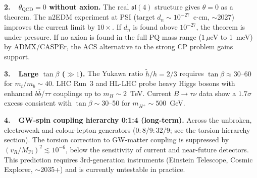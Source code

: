 \documentclass[11pt,a4paper]{article}
\theoremstyle{plain}
\theoremstyle{definition}
\theoremstyle{remark}
\begin{document}
\textbf{2.\ \ $\theta_{\mathrm{QCD}} = 0$ without axion.}
The real $\mathfrak{sl}(4)$ structure gives $\theta = 0$ as a theorem.
The n2EDM experiment at PSI (target $d_n \sim 10^{-27}$~e$\cdot$cm, $\sim$2027)
improves the current limit by $10\times$.  If $d_n$ is found above
$10^{-27}$, the theorem is under pressure.  If no axion is found in the
full PQ mass range ($1\,\mu$eV to 1~meV) by ADMX/CASPEr, the ACS
alternative to the strong CP problem gains support.

\textbf{3.\ \ Large $\tan\beta$ ($\gg 1$).}
The Yukawa ratio $\tilde{h}/h = 2/3$ requires $\tan\beta \approx 30$--$60$
for $m_t/m_b \sim 40$.  LHC Run~3 and HL-LHC probe heavy Higgs bosons with
enhanced $b\bar{b}$/$\tau\tau$ couplings up to $m_H \sim 2$~TeV.
Current $B \to \tau\nu$ data show a $1.7\sigma$ excess consistent with
$\tan\beta \sim 30$--50 for $m_{H^+} \sim 500$~GeV.

\textbf{4.\ \ GW-spin coupling hierarchy 0:1:4 (long-term).}
Across the unbroken, electroweak and colour-lepton generators
($0 : 8/9 : 32/9$; see the torsion-hierarchy section).
The torsion correction to GW-matter coupling is suppressed by
$(v_R/M_{\mathrm{Pl}})^2 \lesssim 10^{-6}$, below the sensitivity of
current and near-future detectors.  This prediction requires
3rd-generation instruments (Einstein Telescope, Cosmic Explorer, $\sim$2035+)
and is currently untestable in practice.
\end{document}
